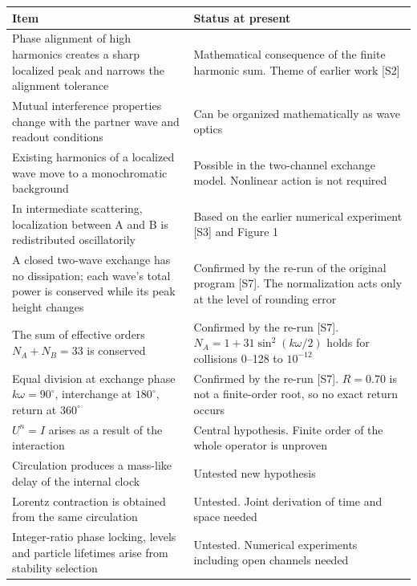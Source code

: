 \documentclass[
  a4paper,
]{article}
\newcounter{none} %
\begin{document}
{\def\LTcaptype{none} %
\begin{longtable}[]{@{}
  >{\raggedright\arraybackslash}p{}
  >{\raggedright\arraybackslash}p{}@{}}
\toprule\noalign{}
\begin{minipage}[b]{\linewidth}\raggedright
Item
\end{minipage} & \begin{minipage}[b]{\linewidth}\raggedright
Status at present
\end{minipage} \\
\midrule\noalign{}
\endhead
\bottomrule\noalign{}
\endlastfoot
Phase alignment of high harmonics creates a sharp localized peak and
narrows the alignment tolerance & Mathematical consequence of the finite
harmonic sum. Theme of earlier work {[}S2{]} \\
Mutual interference properties change with the partner wave and readout
conditions & Can be organized mathematically as wave optics \\
Existing harmonics of a localized wave move to a monochromatic
background & Possible in the two-channel exchange model. Nonlinear
action is not required \\
In intermediate scattering, localization between A and B is
redistributed oscillatorily & Based on the earlier numerical experiment
{[}S3{]} and Figure 1 \\
A closed two-wave exchange has no dissipation; each wave's total power
is conserved while its peak height changes & Confirmed by the re-run of
the original program {[}S7{]}. The normalization acts only at the level
of rounding error \\
The sum of effective orders \(N_A+N_B=33\) is conserved & Confirmed by
the re-run {[}S7{]}. \(N_A=1+31\sin^2(k\omega/2)\) holds for collisions
0--128 to \(10^{-12}\) \\
Equal division at exchange phase \(k\omega=90^\circ\), interchange at
\(180^\circ\), return at \(360^\circ\) & Confirmed by the re-run
{[}S7{]}. \(R=0.70\) is not a finite-order root, so no exact return
occurs \\
\(U^n=I\) arises as a result of the interaction & Central hypothesis.
Finite order of the whole operator is unproven \\
Circulation produces a mass-like delay of the internal clock & Untested
new hypothesis \\
Lorentz contraction is obtained from the same circulation & Untested.
Joint derivation of time and space needed \\
Integer-ratio phase locking, levels and particle lifetimes arise from
stability selection & Untested. Numerical experiments including open
channels needed \\
\end{longtable}
}
\end{document}

